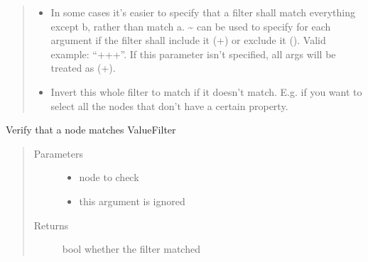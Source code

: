 \documentclass[a4paper,10pt,english]{sphinxmanual}
\begin{document}
\begin{fulllineitems}
\begin{fulllineitems}
\begin{quote}
\begin{description}
\begin{itemize}
\item {}
\sphinxAtStartPar
{} \textendash{} In some cases it’s easier to specify that a filter shall match everything except b, rather than
match a. \textasciitilde{} can be used to specify for each argument if the filter shall include it (+) or exclude it
(\sphinxhyphen{}). Valid example: “++\sphinxhyphen{}+”. If this parameter isn’t specified, all args will be treated as (+).

\item {}
\sphinxAtStartPar
{} \textendash{} Invert this whole filter to match if it doesn’t match. E.g. if you want to select all the nodes
that don’t have a certain property.

\end{itemize}

\end{description}\end{quote}

\end{fulllineitems}


\begin{fulllineitems}
\label{\detokenize{fagus.filters:fagus.filters.VFil.match_node}}
\pysigstartsignatures
{}
\pysigstopsignatures
\sphinxAtStartPar
Verify that a node matches ValueFilter
\begin{quote}\begin{description}
\item[{Parameters}] \leavevmode\begin{itemize}
\item {}
\sphinxAtStartPar
{} \textendash{} node to check

\item {}
\sphinxAtStartPar
\sphinxstyleliteralstrong{\sphinxupquote{\_}} \textendash{} this argument is ignored

\end{itemize}

\item[{Returns}] \leavevmode
\sphinxAtStartPar
bool whether the filter matched


\end{description}
\end{quote}
\end{fulllineitems}
\end{fulllineitems}
\end{document}
